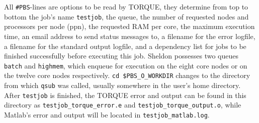 \documentclass[11.5pt,a4paper]{article}
\begin{document}
All \verb$#PBS$-lines are options to be read by TORQUE, they determine from top to bottom the job's name \verb$testjob$, the queue, the number of requested nodes and processors per node (ppn), the requested RAM per core, the maximum execution time, an email address to send status messages to, a filename for the error logfile, a filename for the standard output logfile, and a dependency list for jobs to be finished successfully before executing this job. Sheldon possesses two queues \verb$batch$ and \verb$highmem$, which enqueue for execution on the eight core nodes or on the twelve core nodes respectively. \verb#cd $PBS_O_WORKDIR# changes to the directory from which \verb$qsub$ was called, usually somewhere in the user's home directory. After \verb$testjob$ is finished, the TORQUE error and output can be found in this directory as \verb$testjob_torque_error.e$ and \verb$testjob_torque_output.o$, while Matlab's error and output will be located in \verb$testjob_matlab.log$.
\end{document}

